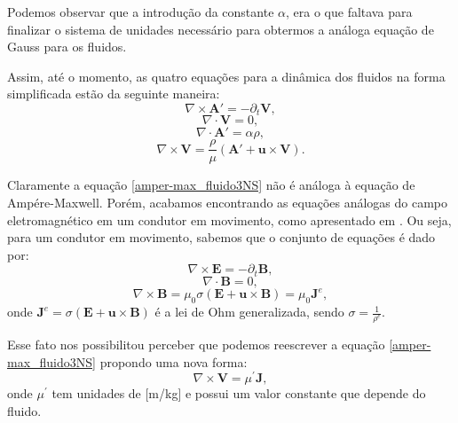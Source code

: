 Podemos observar que a introdução da constante  $\alpha$, era o que faltava para finalizar o sistema de unidades necessário para obtermos a análoga equação de Gauss para os fluidos.

Assim, até o momento, as quatro equações para a dinâmica dos fluidos na forma simplificada estão da seguinte maneira:
\begin{equation}\label{faradey_fluidos3NS}
    \nabla \times \textbf{A}' = -\partial_{t} \textbf{V},
\end{equation}
\begin{equation}\label{gauss_mag_fluid3NS}
    \nabla \cdot \textbf{V}=0,
\end{equation}
\begin{equation}\label{gauss_fluido3NS}
    \nabla \cdot \textbf{A}' = \alpha\rho,
\end{equation}
\begin{equation}\label{amper-max_fluido3NS}
\nabla\times\textbf{V} = \frac{\rho}{\mu}\left( \textbf{A}' + \textbf{u} \times \textbf{V}\right).
\end{equation}

Claramente a equação \ref{amper-max_fluido3NS} não é análoga à equação de Ampére-Maxwell. Porém, acabamos encontrando as equações análogas do campo eletromagnético em um condutor em movimento, como apresentado em
\cite{landau2013electrodynamics}. Ou seja, para um condutor em movimento, sabemos que o conjunto de equações é dado por:
\begin{equation}\label{faradey_fluidos3NS2}
    \nabla \times \textbf{E} = -\partial_{t} \textbf{B},
\end{equation}
\begin{equation}\label{gauss_mag_fluid3NS}
    \nabla \cdot \textbf{B}=0,
\end{equation}
\begin{equation}\label{amper-max_fluido3NS2}
\nabla\times\textbf{B} =\mu_{0}\sigma\left(\textbf{E} + \textbf{u} \times \textbf{B}\right) = \mu_{0}\textbf{J}^{e},
\end{equation}
onde $\textbf{J}^{e}=\sigma\left(\textbf{E} + \textbf{u} \times \textbf{B}\right)$ é a lei de Ohm generalizada, sendo $\sigma =\frac{1}{\rho^{e}} $.

Esse fato nos possibilitou perceber que podemos reescrever a equação \ref{amper-max_fluido3NS} propondo uma nova forma:
\begin{equation}\label{Navier-Ampere1}
    \nabla\times\textbf{V} =\mu^{'}\textbf{J},
\end{equation}
onde $\mu^{'}$ tem unidades de [m/kg] e possui um valor constante que depende do fluido.

